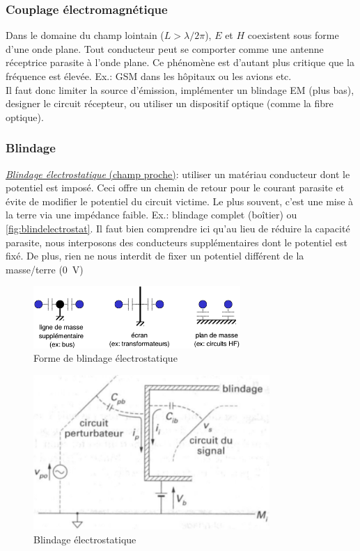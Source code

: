 \subsubsection{Couplage électromagnétique}
Dans le domaine du champ lointain (\(L>\lambda/2\pi\)), \(E\) et \(H\) coexistent sous forme d'une onde plane. Tout conducteur peut se comporter comme une antenne réceptrice parasite à l'onde plane. Ce phénomène est d'autant plus critique que la fréquence est élevée. Ex.: GSM dans les hôpitaux ou les avions etc.\\

Il faut donc limiter la source d'émission, implémenter un blindage EM (plus bas), designer le circuit récepteur, ou  utiliser un dispositif optique (comme la fibre optique).
\subsubsection{Blindage}
\underline{\textit{Blindage électrostatique} (champ proche)}: utiliser un matériau conducteur dont le potentiel est imposé. Ceci offre un chemin de retour pour le courant parasite et évite de modifier le potentiel du circuit victime. Le plus souvent, c'est une mise à la terre via une impédance faible. Ex.: blindage complet (boîtier) ou \autoref{fig:blindelectrostat}. Il faut bien comprendre ici qu'au lieu de réduire la capacité parasite, nous interposons des conducteurs supplémentaires dont le potentiel est fixé. De plus, rien ne nous interdit de fixer un potentiel différent de la masse/terre (\SI{0}{\volt})
\begin{figure}[H] 
	\centering 
	\includegraphics[width=0.7\textwidth,height=10\baselineskip,keepaspectratio]{ch3/image6} 
	\caption{Forme de blindage électrostatique}
	\label{fig:blindelectrostat}
\end{figure}
\begin{figure}[H] 
	\centering 
	\includegraphics[width=0.8\textwidth,height=10\baselineskip,keepaspectratio]{ch3/image7} 
	\caption{Blindage électrostatique}
\end{figure}
